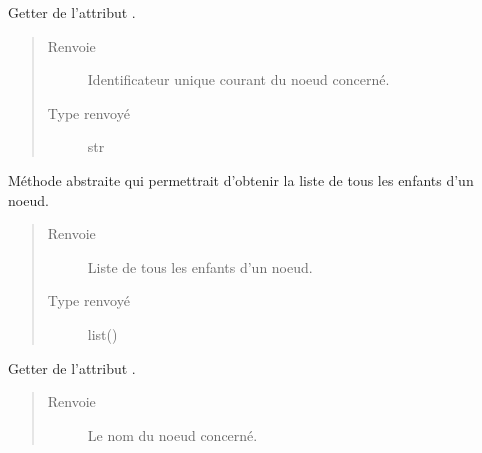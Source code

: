 \documentclass[letterpaper,10pt,french]{sphinxmanual}
\begin{document}
\begin{fulllineitems}
\begin{fulllineitems}
\label{\detokenize{index:StrategyTree.NodeST.get_id}}
Getter de l’attribut .
\begin{quote}\begin{description}
\item[{Renvoie}] \leavevmode
{} \textendash{} Identificateur unique courant du noeud concerné.

\item[{Type renvoyé}] \leavevmode
str

\end{description}\end{quote}

\end{fulllineitems}


\begin{fulllineitems}
\label{\detokenize{index:StrategyTree.NodeST.get_list_of_children}}
Méthode abstraite qui permettrait d’obtenir la liste de tous les
enfants d’un noeud.
\begin{quote}\begin{description}
\item[{Renvoie}] \leavevmode
{} \textendash{} Liste de tous les enfants d’un noeud.

\item[{Type renvoyé}] \leavevmode
list({\hyperref[\detokenize{index:StrategyTree.NodeST}]{}})

\end{description}\end{quote}

\end{fulllineitems}


\begin{fulllineitems}
\label{\detokenize{index:StrategyTree.NodeST.get_name}}
Getter de l’attribut .
\begin{quote}\begin{description}
\item[{Renvoie}] \leavevmode
{} \textendash{} Le nom du noeud concerné.


\end{description}
\end{quote}
\end{fulllineitems}
\end{fulllineitems}
\end{document}

